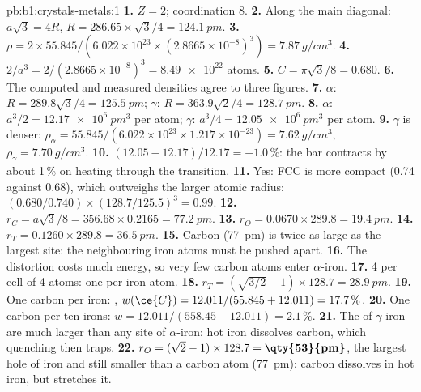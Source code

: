 \begin{solution}{pb:b1:crystals-metals:1}
\textbf{1.} $Z = 2$; coordination 8.
\textbf{2.} Along the main diagonal: $a\sqrt3 = 4R$, $R = 286.65 \times
\sqrt3/4 = \qty{124.1}{pm}$.
\textbf{3.} $\rho = 2 \times 55.845/(6.022 \times 10^{23} \times (2.8665
\times 10^{-8})^3) = \qty{7.87}{g/cm^3}$.
\textbf{4.} $2/a^3 = 2/(2.8665 \times 10^{-8})^3 = \num{8.49e22}$ atoms.
\textbf{5.} $C = \pi\sqrt3/8 = 0.680$.
\textbf{6.} The computed and measured densities agree to three figures.
\textbf{7.} $\alpha$: $R = 289.8\sqrt3/4 = \qty{125.5}{pm}$; $\gamma$:
$R = 363.9\sqrt2/4 = \qty{128.7}{pm}$.
\textbf{8.} $\alpha$: $a^3/2 = \qty{12.17e6}{pm^3}$ per atom; $\gamma$:
$a^3/4 = \qty{12.05e6}{pm^3}$ per atom.
\textbf{9.} $\gamma$ is denser: $\rho_\alpha = 55.845/(6.022 \times 10^{23}
\times 1.217 \times 10^{-23}) = \qty{7.62}{g/cm^3}$, $\rho_\gamma =
\qty{7.70}{g/cm^3}$.
\textbf{10.} $(12.05 - 12.17)/12.17 = -1.0\,\%$: the bar contracts by
about 1\,\% on heating through the transition.
\textbf{11.} Yes: FCC is more compact (0.74 against 0.68), which outweighs
the larger atomic radius: $(0.680/0.740) \times (128.7/125.5)^3 = 0.99$.
\textbf{12.} $r_C = a\sqrt3/8 = 356.68 \times 0.2165 = \qty{77.2}{pm}$.
\textbf{13.} $r_O = 0.0670 \times 289.8 = \qty{19.4}{pm}$.
\textbf{14.} $r_T = 0.1260 \times 289.8 = \qty{36.5}{pm}$.
\textbf{15.} Carbon (\qty{77}{pm}) is twice as large as the largest site:
the neighbouring iron atoms must be pushed apart.
\textbf{16.} The distortion costs much energy, so very few carbon atoms
enter $\alpha$-iron.
\textbf{17.} 4  per cell of 4 atoms: one per iron atom.
\textbf{18.} $r_T = (\sqrt{3/2} - 1) \times 128.7 = \qty{28.9}{pm}$.
\textbf{19.} One carbon per iron: , $w(\ce{C}) = 12.011/(55.845 +
12.011) = 17.7\,\%$.
\textbf{20.} One carbon per ten irons: $w = 12.011/(558.45 + 12.011) =
2.1\,\%$.
\textbf{21.} The  of $\gamma$-iron are much larger than
any site of $\alpha$-iron: hot iron dissolves carbon, which quenching then
traps.
\textbf{22.} $r_O = (\sqrt2 - 1) \times 128.7 = \textbf{\qty{53}{pm}}$, the
largest hole of iron and still smaller than a carbon atom (\qty{77}{pm}):
carbon dissolves in hot iron, but stretches it.
\end{solution}
